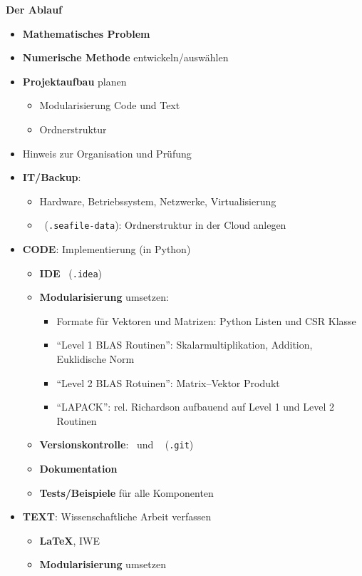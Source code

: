 \clearpage
\textbf{Der Ablauf}
\begin{itemize}
	\item \textbf{Mathematisches Problem}
	\item \textbf{Numerische Methode} entwickeln/auswählen
	\item \textbf{Projektaufbau} planen
	\begin{itemize}
		\item Modularisierung Code und Text
		\item Ordnerstruktur
	\end{itemize}
	\item Hinweis zur Organisation und Prüfung
	\item \textbf{IT/Backup}: 
	\begin{itemize}
		\item  Hardware, Betriebssystem, Netzwerke, Virtualisierung
		\item \seafile\ (\texttt{.seafile-data}): Ordnerstruktur in der Cloud anlegen 
	\end{itemize}
	\item \textbf{CODE}: Implementierung (in Python)
	\begin{itemize}
		\item \textbf{IDE} \pycharm~(\texttt{.idea})
		\item \textbf{Modularisierung} umsetzen:
		\begin{itemize}
			\item Formate für Vektoren und Matrizen: Python Listen und CSR Klasse
			\item ``Level 1 BLAS Routinen'': Skalarmultiplikation, Addition, Euklidische Norm
			\item ``Level 2 BLAS Rotuinen'': Matrix--Vektor Produkt
			\item ``LAPACK'': rel. Richardson aufbauend auf Level 1 und Level 2 Routinen
		\end{itemize}
		\item {\color{gray}\textbf{Versionskontrolle}: \git\ und \gitlab~ (\texttt{.git})}
		\item \textbf{Dokumentation}
		\item \textbf{Tests/Beispiele} für alle Komponenten
	\end{itemize}
	\item \textbf{TEXT}: Wissenschaftliche Arbeit verfassen
	\begin{itemize}
		\item \textbf{\LaTeX}, IWE \texstudio
		\item \textbf{Modularisierung} umsetzen	

\end{itemize}
\end{itemize}
